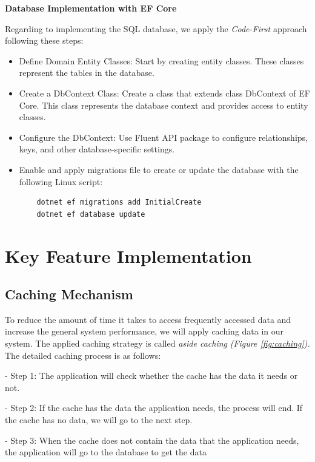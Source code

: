\textbf{Database Implementation with EF Core}

Regarding to implementing the SQL database, we apply the \textit{Code-First} approach following these steps:
\begin{itemize}
    \item Define Domain Entity Classes:
          Start by creating entity classes. These classes represent the tables in the database.

    \item Create a DbContext Class:
          Create a class that extends class DbContext of EF Core. This class represents the database context and provides access to entity classes.

    \item Configure the DbContext:
          Use Fluent API package to configure relationships, keys, and other database-specific settings.

    \item Enable and apply migrations file to create or update the database with the following Linux script:
          \begin{lstlisting}
    dotnet ef migrations add InitialCreate
    dotnet ef database update
  \end{lstlisting}
\end{itemize}

\newpage
\section{Key Feature Implementation}

\subsection{Caching Mechanism}

To reduce the amount of time it takes to access frequently accessed data
and increase the general system performance, we will apply caching data
in our system. The applied caching strategy is called \emph{aside
    caching} \emph{(Figure \ref{fig:caching}).} The detailed caching process is as follows:

- Step 1: The application will check whether the cache has the data it
needs or not.

- Step 2: If the cache has the data the application needs, the process
will end. If the cache has no data, we will go to the next step.

- Step 3: When the cache does not contain the data that the application
needs, the application will go to the database to get the data

